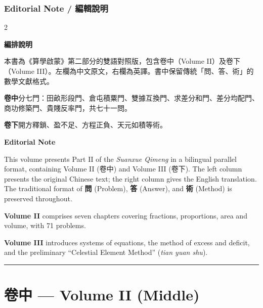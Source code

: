 \documentclass[11pt,a4paper]{article}
\newcommand{\longline}{\noindent\rule{\textwidth}{0.4pt}}
\begin{document}
\tableofcontents
\newpage

\section*{Editorial Note / 編輯說明}
\label{sec:editorial}

\begin{paracol}{2}
\begin{leftcolumn}
\noindent\textbf{編排說明}

本書為《算學啟蒙》第二部分的雙語對照版，包含卷中（Volume II）及卷下（Volume III）。左欄為中文原文，右欄為英譯。書中保留傳統「問、答、術」的數學文獻格式。

\textbf{卷中}分七門：田畝形段門、倉屯積粟門、雙據互換門、求差分和門、差分均配門、商功修築門、貴賤反率門，共七十一問。

\textbf{卷下}開方釋鎖、盈不足、方程正負、天元如積等術。
\end{leftcolumn}

\switchcolumn

\noindent\textbf{Editorial Note}

This volume presents Part II of the \textit{Suanxue Qimeng} in a bilingual parallel format, containing Volume II (\textsc{卷中}) and Volume III (\textsc{卷下}). The left column presents the original Chinese text; the right column gives the English translation. The traditional format of \textbf{問} (Problem), \textbf{答} (Answer), and \textbf{術} (Method) is preserved throughout.

\textbf{Volume II} comprises seven chapters covering fractions, proportions, area and volume, with 71 problems.

\textbf{Volume III} introduces systems of equations, the method of excess and deficit, and the preliminary ``Celestial Element Method'' (\textit{tian yuan shu}).
\end{paracol}

\vspace{1cm}
\begin{center}
\longline
\end{center}
\newpage

\part*{\color{chaptercolor}卷中 --- Volume II (Middle)}
\end{document}
